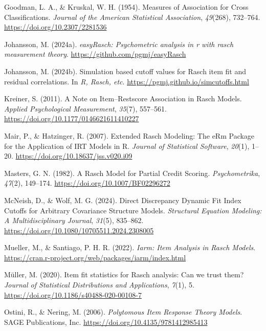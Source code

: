 \documentclass[
  letterpaper,
  DIV=11,
  numbers=noendperiod]{scrartcl}
\newlength{\cslhangindent}
\newenvironment{CSLReferences}[2] %
 {\begin{list}{}{%
  \setlength{\itemindent}{0pt}
  \setlength{\leftmargin}{0pt}
  \setlength{\parsep}{0pt}
  \ifodd #1
   \setlength{\leftmargin}{\cslhangindent}
   \setlength{\itemindent}{-1\cslhangindent}
  \fi
  \setlength{\itemsep}{#2\baselineskip}}}
 {\end{list}}
\begin{document}
\begin{CSLReferences}{1}{0}
Goodman, L. A., \& Kruskal, W. H. (1954). Measures of {Association} for
{Cross} {Classifications}. \emph{Journal of the American Statistical
Association}, \emph{49}(268), 732--764.
\url{https://doi.org/10.2307/2281536}

Johansson, M. (2024a). \emph{easyRasch: Psychometric analysis in r with
rasch measurement theory}. \url{https://github.com/pgmj/easyRasch}

Johansson, M. (2024b). Simulation based cutoff values for {Rasch} item
fit and residual correlations. In \emph{R, Rasch, etc}.
\url{https://pgmj.github.io/simcutoffs.html}

Kreiner, S. (2011). A {Note} on {Item}--{Restscore} {Association} in
{Rasch} {Models}. \emph{Applied Psychological Measurement},
\emph{35}(7), 557--561. \url{https://doi.org/10.1177/0146621611410227}

Mair, P., \& Hatzinger, R. (2007). Extended {Rasch} {Modeling}: {The}
{eRm} {Package} for the {Application} of {IRT} {Models} in {R}.
\emph{Journal of Statistical Software}, \emph{20}(1), 1--20.
\url{https://doi.org/10.18637/jss.v020.i09}

Masters, G. N. (1982). A {Rasch} {Model} for {Partial} {Credit}
{Scoring}. \emph{Psychometrika}, \emph{47}(2), 149--174.
\url{https://doi.org/10.1007/BF02296272}

McNeish, D., \& Wolf, M. G. (2024). Direct {Discrepancy} {Dynamic} {Fit}
{Index} {Cutoffs} for {Arbitrary} {Covariance} {Structure} {Models}.
\emph{Structural Equation Modeling: A Multidisciplinary Journal},
\emph{31}(5), 835--862.
\url{https://doi.org/10.1080/10705511.2024.2308005}

Mueller, M., \& Santiago, P. H. R. (2022). \emph{Iarm: {Item} {Analysis}
in {Rasch} {Models}}.
\url{https://cran.r-project.org/web/packages/iarm/index.html}

Müller, M. (2020). Item fit statistics for {Rasch} analysis: Can we
trust them? \emph{Journal of Statistical Distributions and
Applications}, \emph{7}(1), 5.
\url{https://doi.org/10.1186/s40488-020-00108-7}

Ostini, R., \& Nering, M. (2006). \emph{Polytomous {Item} {Response}
{Theory} {Models}}. SAGE Publications, Inc.
\url{https://doi.org/10.4135/9781412985413}


\end{CSLReferences}
\end{document}
